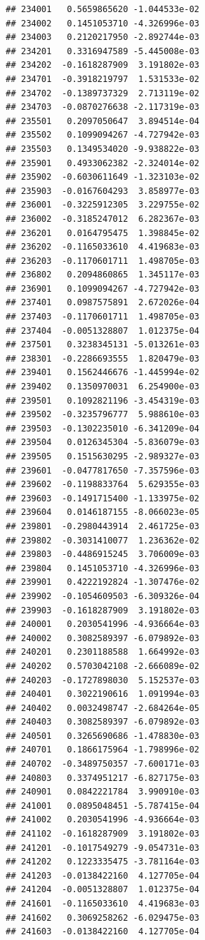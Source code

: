 \documentclass[ignorenonframetext,]{beamer}
\begin{document}
\begin{frame}[fragile]
\begin{verbatim}
## 234001   0.5659865620 -1.044533e-02
## 234002   0.1451053710 -4.326996e-03
## 234003   0.2120217950 -2.892744e-03
## 234201   0.3316947589 -5.445008e-03
## 234202  -0.1618287909  3.191802e-03
## 234701  -0.3918219797  1.531533e-02
## 234702  -0.1389737329  2.713119e-02
## 234703  -0.0870276638 -2.117319e-03
## 235501   0.2097050647  3.894514e-04
## 235502   0.1099094267 -4.727942e-03
## 235503   0.1349534020 -9.938822e-03
## 235901   0.4933062382 -2.324014e-02
## 235902  -0.6030611649 -1.323103e-02
## 235903  -0.0167604293  3.858977e-03
## 236001  -0.3225912305  3.229755e-02
## 236002  -0.3185247012  6.282367e-03
## 236201   0.0164795475  1.398845e-02
## 236202  -0.1165033610  4.419683e-03
## 236203  -0.1170601711  1.498705e-03
## 236802   0.2094860865  1.345117e-03
## 236901   0.1099094267 -4.727942e-03
## 237401   0.0987575891  2.672026e-04
## 237403  -0.1170601711  1.498705e-03
## 237404  -0.0051328807  1.012375e-04
## 237501   0.3238345131 -5.013261e-03
## 238301  -0.2286693555  1.820479e-03
## 239401   0.1562446676 -1.445994e-02
## 239402   0.1350970031  6.254900e-03
## 239501   0.1092821196 -3.454319e-03
## 239502  -0.3235796777  5.988610e-03
## 239503  -0.1302235010 -6.341209e-04
## 239504   0.0126345304 -5.836079e-03
## 239505   0.1515630295 -2.989327e-03
## 239601  -0.0477817650 -7.357596e-03
## 239602  -0.1198833764  5.629355e-03
## 239603  -0.1491715400 -1.133975e-02
## 239604   0.0146187155 -8.066023e-05
## 239801  -0.2980443914  2.461725e-03
## 239802  -0.3031410077  1.236362e-02
## 239803  -0.4486915245  3.706009e-03
## 239804   0.1451053710 -4.326996e-03
## 239901   0.4222192824 -1.307476e-02
## 239902  -0.1054609503 -6.309326e-04
## 239903  -0.1618287909  3.191802e-03
## 240001   0.2030541996 -4.936664e-03
## 240002   0.3082589397 -6.079892e-03
## 240201   0.2301188588  1.664992e-03
## 240202   0.5703042108 -2.666089e-02
## 240203  -0.1727898030  5.152537e-03
## 240401   0.3022190616  1.091994e-03
## 240402   0.0032498747 -2.684264e-05
## 240403   0.3082589397 -6.079892e-03
## 240501   0.3265690686 -1.478830e-03
## 240701   0.1866175964 -1.798996e-02
## 240702  -0.3489750357 -7.600171e-03
## 240803   0.3374951217 -6.827175e-03
## 240901   0.0842221784  3.990910e-03
## 241001   0.0895048451 -5.787415e-04
## 241002   0.2030541996 -4.936664e-03
## 241102  -0.1618287909  3.191802e-03
## 241201  -0.1017549279 -9.054731e-03
## 241202   0.1223335475 -3.781164e-03
## 241203  -0.0138422160  4.127705e-04
## 241204  -0.0051328807  1.012375e-04
## 241601  -0.1165033610  4.419683e-03
## 241602   0.3069258262 -6.029475e-03
## 241603  -0.0138422160  4.127705e-04

\end{verbatim}
\end{frame}
\end{document}
